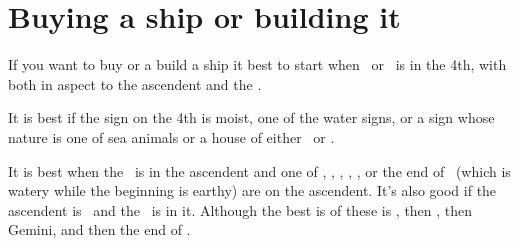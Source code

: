 \section{Buying a ship or building it}
If you want to buy or a build a ship it best to start when \Jupiter\, or \Venus\, is in the 4th, with both in aspect to the ascendent and the \Moon.

It is best if the sign on the 4th is moist, one of the water signs, or a sign whose nature is one of sea animals or a house of either \Jupiter\, or \Venus. 

It is best when the \Moon\, is in the ascendent and one of \Taurus, \Gemini, \Cancer, \Virgo, \Sagittarius, or the end of \Capricorn\, (which is watery while the beginning is earthy) are on the ascendent. It's also good if the ascendent is \Pisces\, and the \Moon\, is in it.  Although the best is of these is \Taurus, then \Pisces, then Gemini, and then the end of \Capricorn.